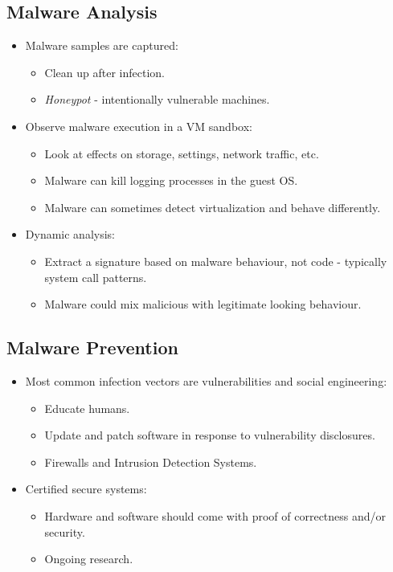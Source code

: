 \documentclass[11pt]{article}
\begin{document}
\subsection{Malware Analysis}
\begin{itemize}
  \item Malware samples are captured:
    \begin{itemize}
      \item Clean up after infection.
      \item \textit{Honeypot} - intentionally vulnerable machines.
    \end{itemize}
  \item Observe malware execution in a VM sandbox:
    \begin{itemize}
      \item Look at effects on storage, settings, network traffic, etc.
      \item Malware can kill logging processes in the guest OS.
      \item Malware can sometimes detect virtualization and behave differently.
    \end{itemize}
  \item Dynamic analysis:
    \begin{itemize}
      \item Extract a signature based on malware behaviour, not code - typically system call patterns.
      \item Malware could mix malicious with legitimate looking behaviour.
    \end{itemize}
\end{itemize}

\subsection{Malware Prevention}
\begin{itemize}
  \item Most common infection vectors are vulnerabilities and social engineering:
    \begin{itemize}
      \item Educate humans.
      \item Update and patch software in response to vulnerability disclosures.
      \item Firewalls and Intrusion Detection Systems.
    \end{itemize}
  \item Certified secure systems:
    \begin{itemize}
      \item Hardware and software should come with proof of correctness and/or security.
      \item Ongoing research.
    \end{itemize}
\end{itemize}
\end{document}
